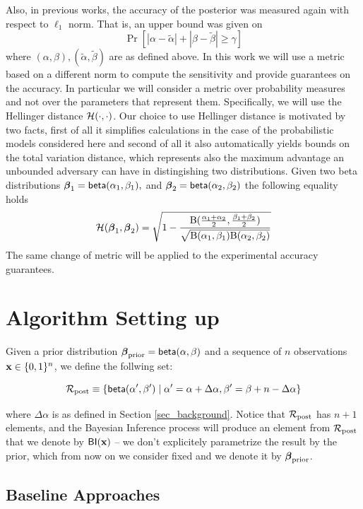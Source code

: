 \documentclass[sigconf]{acmart}
\begin{document}
\noindent Also, in previous works, the accuracy of the posterior was measured again with respect to $\ell_1$ norm. That is, an upper bound was given on
\[
  \Pr[|\alpha - \tilde\alpha| + |\beta - \tilde\beta |\geq \gamma ]
\]
where $(\alpha, \beta), (\tilde\alpha,\tilde\beta)$ are as  defined above.
In this work we will use a metric based on a different norm to compute the sensitivity
and provide guarantees on the accuracy. In particular we will consider a metric
over probability measures and not over the parameters that represent them.
Specifically, we will use the Hellinger distance $\mathcal{H}(\cdot,\cdot)$.
Our choice to use Hellinger distance is motivated by two facts, first of all it simplifies
calculations in the case of the probabilistic models considered here
and second of all it also automatically yields bounds on the total variation distance, which represents also the maximum advantage
an unbounded adversary can have in distingishing two distributions. 
Given two beta distributions
$\boldsymbol{\beta}_1=\mathsf{beta}(\alpha_1, \beta_1),$ and $\boldsymbol{\beta}_2=\mathsf{beta}(\alpha_2, \beta_2)$ the following equality holds 
\[
  \mathcal{H}(\boldsymbol{\beta}_1, \boldsymbol{\beta}_2)=
  \sqrt{1 - \frac{\textup{B}(\frac{\alpha_1 + \alpha_2}{2}, \frac{\beta_1 + \beta_2}{2})}{\sqrt{\textup{B}(\alpha_1,\beta_1)\textup{B}(\alpha_2,\beta_2)}}}
\]
The same change of metric will be applied to the experimental accuracy guarantees.



\section{Algorithm Setting up}
\label{sec_setup}
Given a prior distribution $\boldsymbol{\beta}_{\textup{prior}}=\mathsf{beta}(\alpha, \beta)$ and a sequence of $n$ observations $\textbf{x}\in\{0,1\}^n$, we define the follwing set:

\[
  \mathcal{R}_{\textup{post}}\equiv\{\mathsf{beta}(\alpha',\beta')\mid \alpha'=\alpha+\Delta\alpha, \beta'=\beta+n-\Delta\alpha\}
\]

where $\Delta\alpha$ is as defined in Section
\ref{sec_background}. Notice that $\mathcal{R}_{\textup{post}}$ has $n + 1$ elements, and
the Bayesian Inference process will produce an element from $\mathcal{R}_{\textup{post}}$
that we denote by $\mathsf{BI}(\textbf{x})$ -- we don't explicitely
parametrize the result by the prior, which from now on we consider
fixed and we denote it by $\boldsymbol{\beta}_{\textup{prior}}$.

\subsection{Baseline Approaches} 
\end{document}
